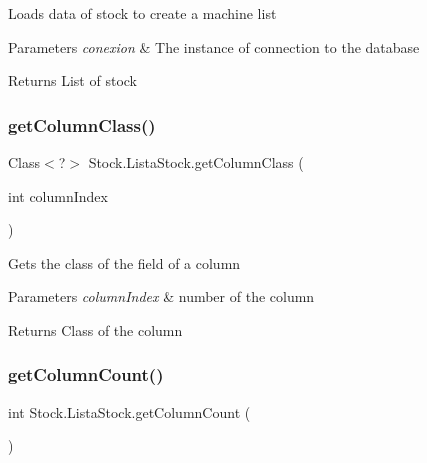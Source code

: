 Loads data of stock to create a machine list 
\begin{DoxyParams}{Parameters}
{\em conexion} & The instance of connection to the database \\
\hline
\end{DoxyParams}
\begin{DoxyReturn}{Returns}
List of stock 
\end{DoxyReturn}
\mbox{\label{class_stock_1_1_lista_stock_a18471e9271be7455310d9a277337c38e}} 
\subsubsection{\texorpdfstring{get\+Column\+Class()}{getColumnClass()}}
{\footnotesize\ttfamily Class$<$?$>$ Stock.\+Lista\+Stock.\+get\+Column\+Class (\begin{DoxyParamCaption}\item[{int}]{column\+Index }\end{DoxyParamCaption})\hspace{0.3cm}{\ttfamily [inline]}}

Gets the class of the field of a column 
\begin{DoxyParams}{Parameters}
{\em column\+Index} & number of the column \\
\hline
\end{DoxyParams}
\begin{DoxyReturn}{Returns}
Class of the column 
\end{DoxyReturn}
\mbox{\label{class_stock_1_1_lista_stock_ad1b8da2d5ddcb4627e47533953e12d84}} 
\subsubsection{\texorpdfstring{get\+Column\+Count()}{getColumnCount()}}
{\footnotesize\ttfamily int Stock.\+Lista\+Stock.\+get\+Column\+Count (\begin{DoxyParamCaption}{ }\end{DoxyParamCaption})\hspace{0.3cm}{\ttfamily [inline]}}

